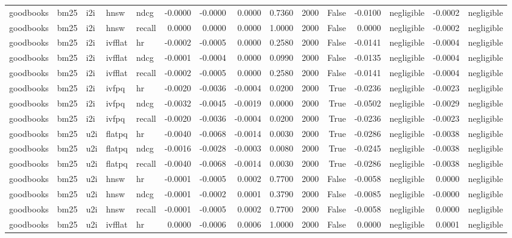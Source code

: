 \begin{tabular}{lllllrrrrrrrlrl}
goodbooks & bm25 & i2i & hnsw & ndcg & -0.0000 & -0.0000 & 0.0000 & 0.7360 & 2000 & False & -0.0100 & negligible & -0.0002 & negligible \\
goodbooks & bm25 & i2i & hnsw & recall & 0.0000 & 0.0000 & 0.0000 & 1.0000 & 2000 & False & 0.0000 & negligible & -0.0002 & negligible \\
goodbooks & bm25 & i2i & ivfflat & hr & -0.0002 & -0.0005 & 0.0000 & 0.2580 & 2000 & False & -0.0141 & negligible & -0.0004 & negligible \\
goodbooks & bm25 & i2i & ivfflat & ndcg & -0.0001 & -0.0004 & 0.0000 & 0.0990 & 2000 & False & -0.0135 & negligible & -0.0004 & negligible \\
goodbooks & bm25 & i2i & ivfflat & recall & -0.0002 & -0.0005 & 0.0000 & 0.2580 & 2000 & False & -0.0141 & negligible & -0.0004 & negligible \\
goodbooks & bm25 & i2i & ivfpq & hr & -0.0020 & -0.0036 & -0.0004 & 0.0200 & 2000 & True & -0.0236 & negligible & -0.0023 & negligible \\
goodbooks & bm25 & i2i & ivfpq & ndcg & -0.0032 & -0.0045 & -0.0019 & 0.0000 & 2000 & True & -0.0502 & negligible & -0.0029 & negligible \\
goodbooks & bm25 & i2i & ivfpq & recall & -0.0020 & -0.0036 & -0.0004 & 0.0200 & 2000 & True & -0.0236 & negligible & -0.0023 & negligible \\
goodbooks & bm25 & u2i & flatpq & hr & -0.0040 & -0.0068 & -0.0014 & 0.0030 & 2000 & True & -0.0286 & negligible & -0.0038 & negligible \\
goodbooks & bm25 & u2i & flatpq & ndcg & -0.0016 & -0.0028 & -0.0003 & 0.0080 & 2000 & True & -0.0245 & negligible & -0.0038 & negligible \\
goodbooks & bm25 & u2i & flatpq & recall & -0.0040 & -0.0068 & -0.0014 & 0.0030 & 2000 & True & -0.0286 & negligible & -0.0038 & negligible \\
goodbooks & bm25 & u2i & hnsw & hr & -0.0001 & -0.0005 & 0.0002 & 0.7700 & 2000 & False & -0.0058 & negligible & 0.0000 & negligible \\
goodbooks & bm25 & u2i & hnsw & ndcg & -0.0001 & -0.0002 & 0.0001 & 0.3790 & 2000 & False & -0.0085 & negligible & -0.0000 & negligible \\
goodbooks & bm25 & u2i & hnsw & recall & -0.0001 & -0.0005 & 0.0002 & 0.7700 & 2000 & False & -0.0058 & negligible & 0.0000 & negligible \\
goodbooks & bm25 & u2i & ivfflat & hr & 0.0000 & -0.0006 & 0.0006 & 1.0000 & 2000 & False & 0.0000 & negligible & 0.0001 & negligible \\

\end{tabular}
